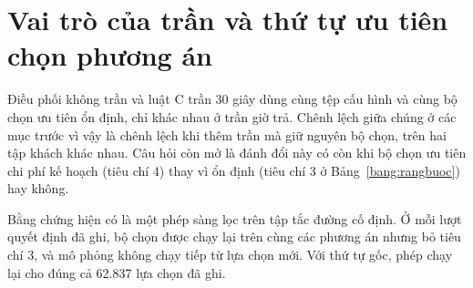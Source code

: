 
\section{Vai trò của trần và thứ tự ưu tiên chọn phương án}
\label{muc:c4-vaitro}

Điều phối không trần và luật C trần 30 giây dùng cùng tệp cấu hình và cùng bộ chọn ưu tiên ổn định, chỉ khác nhau
ở trần giờ trả. Chênh lệch giữa chúng ở các mục trước vì vậy là chênh lệch khi thêm trần mà giữ nguyên bộ chọn, trên
hai tập khách khác nhau. Câu hỏi còn mở là đánh đổi này có còn khi bộ chọn ưu tiên chi phí kế hoạch (tiêu chí 4) thay
vì ổn định (tiêu chí 3 ở Bảng~\ref{bang:rangbuoc}) hay không.

Bằng chứng hiện có là một phép sàng lọc trên tập tắc đường cố định. Ở mỗi lượt quyết định đã ghi, bộ chọn được chạy
lại trên cùng các phương án nhưng bỏ tiêu chí 3, và mô phỏng không chạy tiếp từ lựa chọn mới. Với thứ tự gốc, phép
chạy lại cho đúng cả 62.837 lựa chọn đã ghi.

